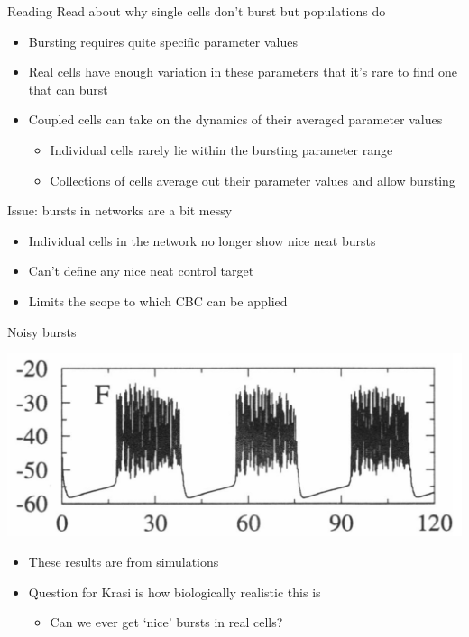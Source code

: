\documentclass[presentation]{beamer}
\begin{document}
\begin{frame}[label={sec:orge947dd8}]{Reading}
Read about why single cells don't burst but populations do
\begin{itemize}
\item Bursting requires quite specific parameter values
\item Real cells have enough variation in these parameters that it's rare to find one that can burst
\item Coupled cells can take on the dynamics of their averaged parameter values
\begin{itemize}
\item Individual cells rarely lie within the bursting parameter range
\item Collections of cells average out their parameter values and allow bursting
\end{itemize}
\end{itemize}
\vfill
Issue: bursts in networks are a bit messy
\begin{itemize}
\item Individual cells in the network no longer show nice neat bursts
\item Can't define any nice neat control target
\item Limits the scope to which CBC can be applied
\end{itemize}
\end{frame}

\begin{frame}[label={sec:orgabc66ac}]{Noisy bursts}
\begin{center}
\includegraphics[width=.9\linewidth]{./burst.png}
\end{center}
\vfill
\begin{itemize}
\item These results are from simulations
\item Question for Krasi is how biologically realistic this is
\begin{itemize}
\item Can we ever get `nice' bursts in real cells?
\end{itemize}
\end{itemize}
\end{frame}
\end{document}

